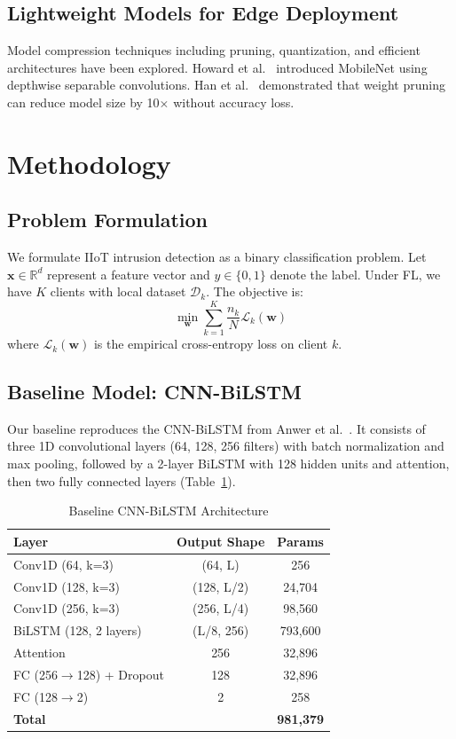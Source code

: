 \documentclass[12pt,a4paper]{article}
\begin{document}
\subsection{Lightweight Models for Edge Deployment}

Model compression techniques including pruning, quantization, and efficient architectures have been explored. Howard et al.~\cite{howard2017mobilenets} introduced MobileNet using depthwise separable convolutions. Han et al.~\cite{han2016deep} demonstrated that weight pruning can reduce model size by 10$\times$ without accuracy loss.

\section{Methodology}

\subsection{Problem Formulation}

We formulate IIoT intrusion detection as a binary classification problem. Let $\mathbf{x} \in \mathbb{R}^d$ represent a feature vector and $y \in \{0, 1\}$ denote the label. Under FL, we have $K$ clients with local dataset $\mathcal{D}_k$. The objective is:
\begin{equation}
\min_{\mathbf{w}} \sum_{k=1}^{K} \frac{n_k}{N} \mathcal{L}_k(\mathbf{w})
\end{equation}
where $\mathcal{L}_k(\mathbf{w})$ is the empirical cross-entropy loss on client $k$.

\subsection{Baseline Model: CNN-BiLSTM}

Our baseline reproduces the CNN-BiLSTM from Anwer et al.~\cite{anwer2025advanced}. It consists of three 1D convolutional layers (64, 128, 256 filters) with batch normalization and max pooling, followed by a 2-layer BiLSTM with 128 hidden units and attention, then two fully connected layers (Table~\ref{tab:baseline}).

\begin{table}[hbt]
\centering
\caption{Baseline CNN-BiLSTM Architecture}
\label{tab:baseline}
\begin{tabular}{lcc}
\toprule
Layer & Output Shape & Params \\
\midrule
Conv1D (64, k=3) & (64, L) & 256 \\
Conv1D (128, k=3) & (128, L/2) & 24,704 \\
Conv1D (256, k=3) & (256, L/4) & 98,560 \\
BiLSTM (128, 2 layers) & (L/8, 256) & 793,600 \\
Attention & 256 & 32,896 \\
FC (256$\rightarrow$128) + Dropout & 128 & 32,896 \\
FC (128$\rightarrow$2) & 2 & 258 \\
\midrule
\textbf{Total} & & \textbf{981,379} \\
\bottomrule
\end{tabular}
\end{table}
\end{document}
